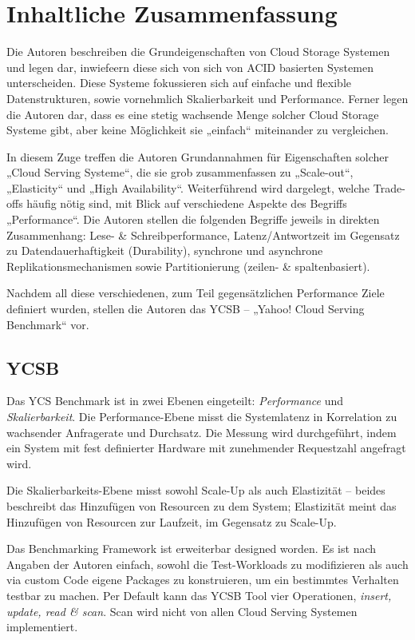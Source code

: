 \section{Inhaltliche Zusammenfassung}

Die Autoren beschreiben die Grundeigenschaften von Cloud Storage Systemen und legen dar, inwiefeern diese sich von sich von ACID basierten Systemen unterscheiden. Diese Systeme fokussieren sich auf einfache und flexible Datenstrukturen, sowie vornehmlich Skalierbarkeit und Performance. Ferner legen die Autoren dar, dass es eine stetig wachsende Menge solcher Cloud Storage Systeme gibt, aber keine Möglichkeit sie „einfach“ miteinander zu vergleichen.

In diesem Zuge treffen die Autoren Grundannahmen für Eigenschaften solcher „Cloud Serving Systeme“, die sie grob zusammenfassen zu „Scale-out“, „Elasticity“ und „High Availability“. Weiterführend wird dargelegt, welche Trade-offs häufig nötig sind, mit Blick auf verschiedene Aspekte des Begriffs „Performance“. Die Autoren stellen die folgenden Begriffe jeweils in direkten Zusammenhang: Lese- \& Schreibperformance, Latenz/Antwortzeit im Gegensatz zu Datendauerhaftigkeit (Durability), synchrone und asynchrone Replikationsmechanismen sowie Partitionierung (zeilen- \& spaltenbasiert).

Nachdem all diese verschiedenen, zum Teil gegensätzlichen Performance Ziele definiert wurden, stellen die Autoren das YCSB -- „Yahoo! Cloud Serving Benchmark“ vor.


\subsection{YCSB}

Das YCS Benchmark ist in zwei Ebenen eingeteilt: \textit{Performance} und \textit{Skalierbarkeit}. Die Performance-Ebene misst die Systemlatenz in Korrelation zu wachsender Anfragerate und Durchsatz. Die Messung wird durchgeführt, indem ein System mit fest definierter Hardware mit zunehmender Requestzahl angefragt wird.

Die Skalierbarkeits-Ebene misst sowohl Scale-Up als auch Elastizität -- beides beschreibt das Hinzufügen von Resourcen zu dem System; Elastizität meint das Hinzufügen von Resourcen zur Laufzeit, im Gegensatz zu Scale-Up.

Das Benchmarking Framework ist erweiterbar designed worden. Es ist nach Angaben der Autoren einfach, sowohl die Test-Workloads zu modifizieren als auch via custom Code eigene Packages zu konstruieren, um ein bestimmtes Verhalten testbar zu machen. Per Default kann das YCSB Tool vier Operationen, \textit{insert, update, read \& scan}. Scan wird nicht von allen Cloud Serving Systemen implementiert. 

